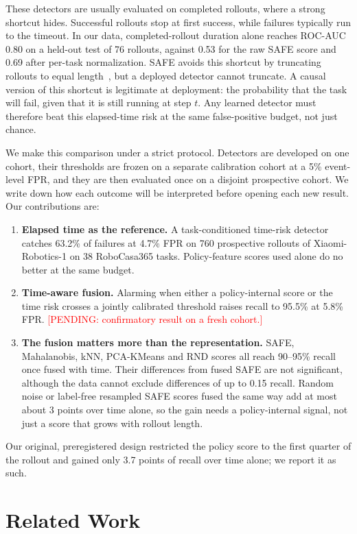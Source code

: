 \documentclass[conference,a4paper]{IEEEtran}
\newcommand{\pending}[1]{\textcolor{red}{[PENDING: #1]}}
\begin{document}
These detectors are usually evaluated on completed rollouts, where a strong shortcut hides.
Successful rollouts stop at first success, while failures typically run to the timeout. In
our data, completed-rollout duration alone reaches ROC-AUC 0.80 on a held-out test of 76
rollouts, against 0.53 for the raw SAFE score and 0.69 after per-task normalization. SAFE
avoids this shortcut by truncating rollouts to equal length~\cite{gu2025safe}, but a
deployed detector cannot truncate. A causal version of this shortcut is legitimate at deployment: the probability that
the task will fail, given that it is still running at step $t$. Any learned detector must
therefore beat this elapsed-time risk at the same false-positive budget, not just chance.

We make this comparison under a strict protocol. Detectors are developed on one cohort,
their thresholds are frozen on a separate calibration cohort at a 5\% event-level FPR, and
they are then evaluated once on a disjoint prospective cohort. We write down how each
outcome will be interpreted before opening each new result. Our contributions are:
\begin{enumerate}
  \item \textbf{Elapsed time as the reference.} A task-conditioned time-risk detector
  catches 63.2\% of failures at 4.7\% FPR on 760 prospective rollouts of
  Xiaomi-Robotics-1 on 38 RoboCasa365 tasks. Policy-feature scores used alone do no
  better at the same budget.
  \item \textbf{Time-aware fusion.} Alarming when either a policy-internal score or the
  time risk crosses a jointly calibrated threshold raises recall to 95.5\% at 5.8\% FPR.
  \pending{confirmatory result on a fresh cohort.}
  \item \textbf{The fusion matters more than the representation.} SAFE, Mahalanobis, kNN,
  PCA-KMeans and RND scores all reach 90--95\% recall once fused with time. Their
  differences from fused SAFE are not significant, although the data cannot exclude
  differences of up to 0.15 recall. Random noise or label-free resampled SAFE scores fused
the same way add at most about 3 points over time alone, so the gain needs a policy-internal
signal, not just a score that grows with rollout length.
\end{enumerate}
Our original, preregistered design restricted the policy score to the first quarter of
the rollout and gained only 3.7 points of recall over time alone; we report it as such.

\section{Related Work}
\end{document}
